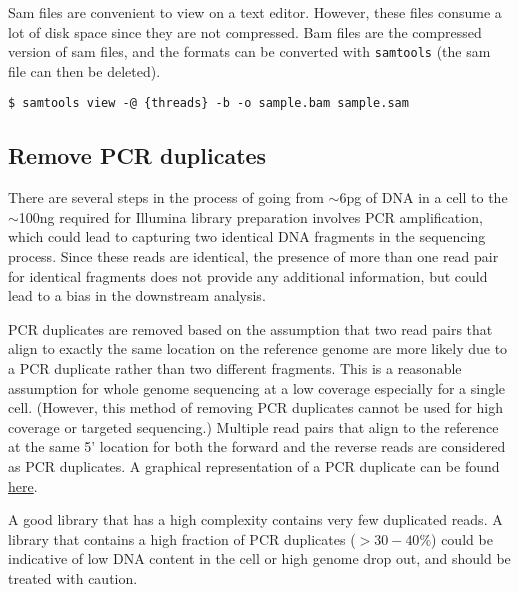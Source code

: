 \documentclass[11pt]{article}
\newcommand{\prog}[1]{\texttt{#1}}
\begin{document}
Sam files are convenient to view on a text editor. However, these files
consume a lot of disk space since they are not compressed. Bam files are
the compressed version of sam files, and the formats can be converted
with \prog{samtools} (the sam file can then be deleted).
\begin{verbatim}
$ samtools view -@ {threads} -b -o sample.bam sample.sam
\end{verbatim}

\subsection{Remove PCR duplicates}
There are several steps in the process of going from
$\sim$6\si{\pico\gram} of DNA in a cell to the $\sim$100\si{\nano\gram}
required for Illumina library preparation involves PCR amplification,
which could lead to capturing two identical DNA fragments in the
sequencing process.  Since these reads are identical, the presence of
more than one read pair for identical fragments does not provide any
additional information, but could lead to a bias in the downstream
analysis.

PCR duplicates are removed based on the assumption that two read pairs
that align to exactly the same location on the reference genome are more
likely due to a PCR duplicate rather than two different fragments. This
is a reasonable assumption for whole genome sequencing at a low coverage
especially for a single cell. (However, this method of removing PCR
duplicates cannot be used for high coverage or targeted sequencing.)
Multiple read pairs that align to the reference at the same 5' location
for both the forward and the reverse reads are considered as PCR
duplicates. A graphical representation of a PCR duplicate can be found
\href{https://www.htslib.org/algorithms/duplicate.html}{here}.

A good library that has a high complexity contains very few duplicated
reads. A library that contains a high fraction of PCR duplicates ($>30-40\%$)
could be indicative of low DNA content in the cell or high genome drop out,
and should be treated with caution.
\end{document}
